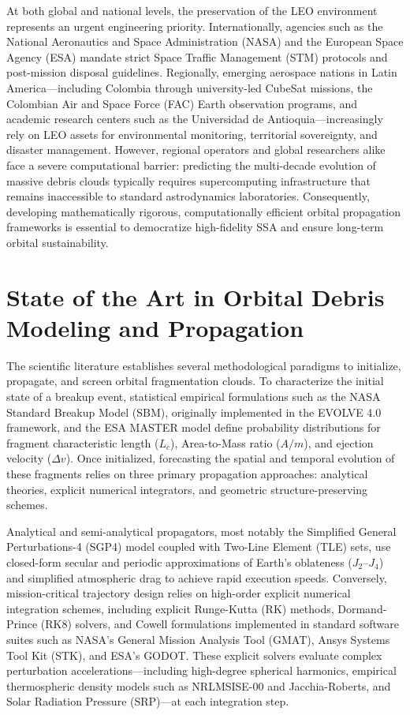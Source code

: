 At both global and national levels, the preservation of the LEO environment represents an urgent engineering priority. Internationally, agencies such as the National Aeronautics and Space Administration (NASA) and the European Space Agency (ESA) mandate strict Space Traffic Management (STM) protocols and post-mission disposal guidelines. Regionally, emerging aerospace nations in Latin America---including Colombia through university-led CubeSat missions, the Colombian Air and Space Force (FAC) Earth observation programs, and academic research centers such as the Universidad de Antioquia---increasingly rely on LEO assets for environmental monitoring, territorial sovereignty, and disaster management. However, regional operators and global researchers alike face a severe computational barrier: predicting the multi-decade evolution of massive debris clouds typically requires supercomputing infrastructure that remains inaccessible to standard astrodynamics laboratories. Consequently, developing mathematically rigorous, computationally efficient orbital propagation frameworks is essential to democratize high-fidelity SSA and ensure long-term orbital sustainability.

\section{State of the Art in Orbital Debris Modeling and Propagation}
\label{sec:sota}

The scientific literature establishes several methodological paradigms to initialize, propagate, and screen orbital fragmentation clouds. To characterize the initial state of a breakup event, statistical empirical formulations such as the NASA Standard Breakup Model (SBM), originally implemented in the EVOLVE 4.0 framework, and the ESA MASTER model define probability distributions for fragment characteristic length ($L_c$), Area-to-Mass ratio ($A/m$), and ejection velocity ($\Delta v$). Once initialized, forecasting the spatial and temporal evolution of these fragments relies on three primary propagation approaches: analytical theories, explicit numerical integrators, and geometric structure-preserving schemes.

Analytical and semi-analytical propagators, most notably the Simplified General Perturbations-4 (SGP4) model coupled with Two-Line Element (TLE) sets, use closed-form secular and periodic approximations of Earth's oblateness ($J_2$--$J_4$) and simplified atmospheric drag to achieve rapid execution speeds. Conversely, mission-critical trajectory design relies on high-order explicit numerical integration schemes, including explicit Runge-Kutta (RK) methods, Dormand-Prince (RK8) solvers, and Cowell formulations implemented in standard software suites such as NASA's General Mission Analysis Tool (GMAT), Ansys Systems Tool Kit (STK), and ESA's GODOT. These explicit solvers evaluate complex perturbation accelerations---including high-degree spherical harmonics, empirical thermospheric density models such as NRLMSISE-00 and Jacchia-Roberts, and Solar Radiation Pressure (SRP)---at each integration step.

